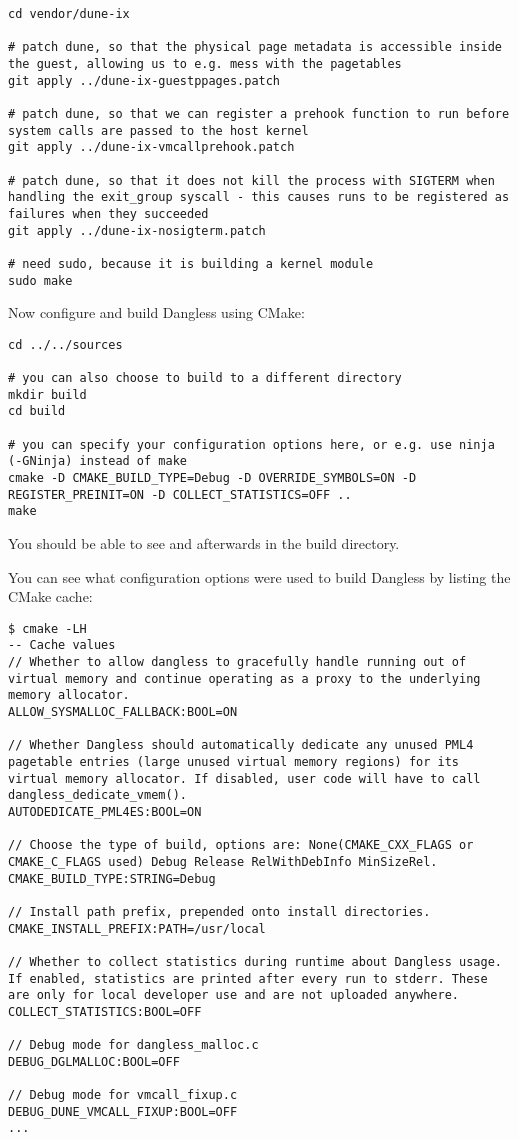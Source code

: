 \begin{verbatim}
cd vendor/dune-ix

# patch dune, so that the physical page metadata is accessible inside the guest, allowing us to e.g. mess with the pagetables
git apply ../dune-ix-guestppages.patch

# patch dune, so that we can register a prehook function to run before system calls are passed to the host kernel
git apply ../dune-ix-vmcallprehook.patch

# patch dune, so that it does not kill the process with SIGTERM when handling the exit_group syscall - this causes runs to be registered as failures when they succeeded
git apply ../dune-ix-nosigterm.patch

# need sudo, because it is building a kernel module
sudo make
\end{verbatim}

Now configure and build Dangless using CMake:

\begin{verbatim}
cd ../../sources

# you can also choose to build to a different directory
mkdir build
cd build

# you can specify your configuration options here, or e.g. use ninja (-GNinja) instead of make
cmake -D CMAKE_BUILD_TYPE=Debug -D OVERRIDE_SYMBOLS=ON -D REGISTER_PREINIT=ON -D COLLECT_STATISTICS=OFF ..
make
\end{verbatim}

You should be able to see  and  afterwards in the build directory.

You can see what configuration options were used to build Dangless by listing the CMake cache:

\begin{verbatim}
$ cmake -LH
-- Cache values
// Whether to allow dangless to gracefully handle running out of virtual memory and continue operating as a proxy to the underlying memory allocator.
ALLOW_SYSMALLOC_FALLBACK:BOOL=ON

// Whether Dangless should automatically dedicate any unused PML4 pagetable entries (large unused virtual memory regions) for its virtual memory allocator. If disabled, user code will have to call dangless_dedicate_vmem().
AUTODEDICATE_PML4ES:BOOL=ON

// Choose the type of build, options are: None(CMAKE_CXX_FLAGS or CMAKE_C_FLAGS used) Debug Release RelWithDebInfo MinSizeRel.
CMAKE_BUILD_TYPE:STRING=Debug

// Install path prefix, prepended onto install directories.
CMAKE_INSTALL_PREFIX:PATH=/usr/local

// Whether to collect statistics during runtime about Dangless usage. If enabled, statistics are printed after every run to stderr. These are only for local developer use and are not uploaded anywhere.
COLLECT_STATISTICS:BOOL=OFF

// Debug mode for dangless_malloc.c
DEBUG_DGLMALLOC:BOOL=OFF

// Debug mode for vmcall_fixup.c
DEBUG_DUNE_VMCALL_FIXUP:BOOL=OFF
...
\end{verbatim}

